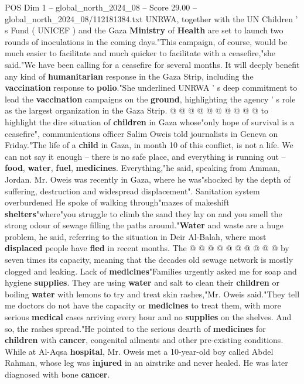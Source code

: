 \begin{textsample}{POS Dim 1 – global\_north\_2024\_08 – Score 29.00 – global\_north\_2024\_08/112181384.txt}
UNRWA, together with the UN Children ' s Fund ( UNICEF ) and the Gaza \textbf{Ministry} of \textbf{Health} are set to launch two rounds of inoculations in the coming days."This campaign, of course, would be much easier to facilitate and much quicker to facilitate with a ceasefire,"she said."We have been calling for a ceasefire for several months.
It will deeply benefit any kind of \textbf{humanitarian} response in the Gaza Strip, including the \textbf{vaccination} response to \textbf{polio}."She underlined UNRWA ' s deep commitment to lead the \textbf{vaccination} campaigns on the \textbf{ground}, highlighting the agency ' s role as the largest organization in the Gaza Strip. @ @ @ @ @ @ @ @ @ @ to highlight the dire situation of \textbf{children} in Gaza whose"only hope of survival is a ceasefire", communications officer Salim Oweis told journalists in Geneva on Friday."The life of a \textbf{child} in Gaza, in month 10 of this conflict, is not a life.
We can not say it enough -- there is no safe place, and everything is running out -- \textbf{food}, \textbf{water}, \textbf{fuel}, \textbf{medicines}.
Everything,"he said, speaking from Amman, Jordan.
Mr.
Oweis was recently in Gaza, where he was"shocked by the depth of suffering, destruction and widespread displacement".
Sanitation system overburdened He spoke of walking through"mazes of makeshift \textbf{shelters}"where"you struggle to climb the sand they lay on and you smell the strong odour of sewage filling the paths around."\textbf{Water} and waste are a huge problem, he said, referring to the situation in Deir Al-Balah, where most \textbf{displaced} people have \textbf{fled} in recent months.
The @ @ @ @ @ @ @ @ @ @ by seven times its capacity, meaning that the decades old sewage network is mostly clogged and leaking.
Lack of \textbf{medicines}"Families urgently asked me for soap and hygiene \textbf{supplies}.
They are using \textbf{water} and salt to clean their \textbf{children} or boiling \textbf{water} with lemons to try and treat skin rashes,"Mr.
Oweis said."They tell me doctors do not have the capacity or \textbf{medicines} to treat them, with more serious \textbf{medical} cases arriving every hour and no \textbf{supplies} on the shelves.
And so, the rashes spread."He pointed to the serious dearth of \textbf{medicines} for \textbf{children} with \textbf{cancer}, congenital ailments and other pre-existing conditions.
While at Al-Aqsa \textbf{hospital}, Mr.
Oweis met a 10-year-old boy called Abdel Rahman, whose leg was \textbf{injured} in an airstrike and never healed.
He was later diagnosed with bone \textbf{cancer}.

\end{textsample}
